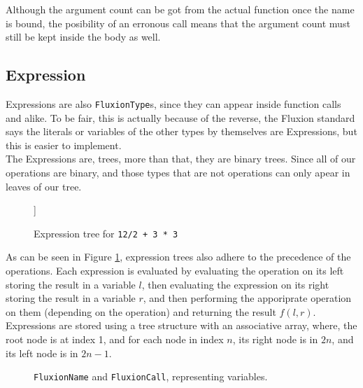 \documentclass[11pt,a4paper]{article}
\newcommand{\code}[1]{\texttt{#1}}
\begin{document}
Although the argument count can be got from the actual function once the name is bound, the posibility of an erronous call means that the argument count must still be kept inside the body as well.

\pagebreak
\subsection{Expression}

Expressions are also \code{FluxionType}s, since they can appear inside function calls and alike. To be fair, this is actually because of the reverse, the Fluxion standard says the literals or variables of the other types by themselves are Expressions, but this is easier to implement.\\

The Expressions are, trees, more than that, they are binary trees. Since all of our operations are binary, and those types that are not operations can only apear in leaves of our tree.

\begin{figure}[httb]
\Tree [.\code{+} [.\code{/} \code{12} \code{2} ] [.\code{*} \code{3} \code{3} ] ]
\caption{Expression tree for \code{12/2 + 3 * 3}}
\label{fig:tree}
\end{figure}

As can be seen in Figure \ref{fig:tree}, expression trees also adhere to the precedence of the operations. Each expression is evaluated by evaluating the operation on its left storing the result in a variable $l$, then evaluating the expression on its right storing the result in a variable $r$, and then performing the apporiprate operation on them (depending on the operation) and returning the result $f(l, r)$.\\

Expressions are stored using a tree structure with an associative array, where, the root node is at index 1, and for each node in index $n$, 
its right node is in $2n$, and its left node is in $2n - 1$.\\

\begin{figure}[httb]
\begin{center}
\end{center}
\caption{\code{FluxionName} and \code{FluxionCall}, representing variables.}
\end{figure}
\end{document}
